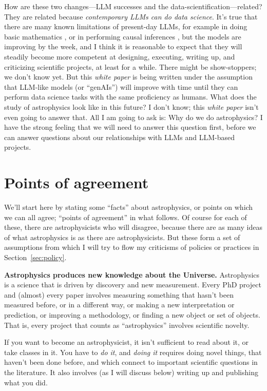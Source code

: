 \documentclass{article}
\newcommand{\documentname}{\textsl{white paper}}
\newcommand{\sectionname}{Section}
\newcommand{\secref}[1]{\sectionname~\ref{#1}}
\newcommand{\paragraphskip}{\medskip}
\renewcommand{\paragraph}[1]{\par\paragraphskip\noindent\textbf{#1}}
\begin{document}
How are these two changes---LLM successes and the data-scientification---related?
They are related because \emph{contemporary LLMs can do data science}.
It's true that there are many known limitations of present-day LLMs, for example in doing basic mathematics \cite{arithmetic}, or in performing causal inferences \cite{causal}, but the models are improving by the week, and I think it is reasonable to expect that they will steadily become more competent at designing, executing, writing up, and criticizing scientific projects, at least for a while.
There might be show-stoppers; we don't know yet.
But this \documentname{} is being written under the assumption that LLM-like models (or ``genAIs'') will improve with time until they can perform data science tasks with the same proficiency as humans.
What does the study of astrophysics look like in this future?
I don't know; this \documentname{} isn't even going to answer that.
All I am going to ask is: Why do we do astrophysics?
I have the strong feeling that we will need to answer this question first, before we can answer questions about our relationships with LLMs and LLM-based projects.

\section{Points of agreement}\label{sec:facts}
We'll start here by stating some ``facts'' about astrophysics, or points on which we can all agree; ``points of agreement'' in what follows.
Of course for each of these, there are astrophysicists who will disagree, because there are as many ideas of what astrophysics is as there are astrophysicists.
But these form a set of assumptions from which I will try to flow my criticisms of policies or practices in \secref{sec:policy}.

\paragraph{Astrophysics produces new knowledge about the Universe.}
Astrophysics is a science that is driven by discovery and new measurement.
Every PhD project and (almost) every paper involves measuring something that hasn't been measured before, or in a different way, or making a new interpretation or prediction, or improving a methodology, or finding a new object or set of objects.
That is, every project that counts as ``astrophysics'' involves scientific novelty.

If you want to become an astrophysicist, it isn't sufficient to read about it, or take classes in it.
You have to \emph{do it}, and \emph{doing it} requires doing novel things, that haven't been done before, and which connect to important scientific questions in the literature.
It also involves (as I will discuss below) writing up and publishing what you did.
\end{document}
